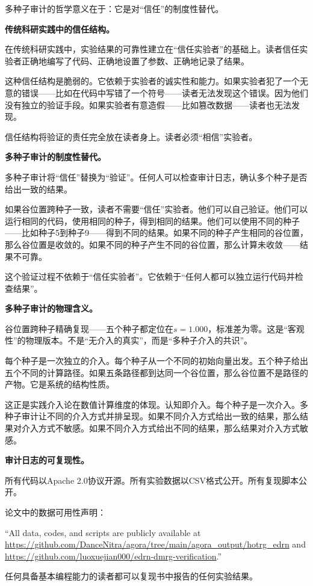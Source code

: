 \documentclass[11pt,a4paper]{book}
\theoremstyle{definition}
\begin{document}
多种子审计的哲学意义在于：它是对“信任”的制度性替代。

\textbf{传统科研实践中的信任结构。}

在传统科研实践中，实验结果的可靠性建立在“信任实验者”的基础上。读者信任实验者正确地编写了代码、正确地设置了参数、正确地记录了结果。

这种信任结构是脆弱的。它依赖于实验者的诚实性和能力。如果实验者犯了一个无意的错误——比如在代码中写错了一个符号——读者无法发现这个错误。因为他们没有独立的验证手段。如果实验者有意造假——比如篡改数据——读者也无法发现。

信任结构将验证的责任完全放在读者身上。读者必须“相信”实验者。

\textbf{多种子审计的制度性替代。}

多种子审计将“信任”替换为“验证”。任何人可以检查审计日志，确认多个种子是否给出一致的结果。

如果谷位置跨种子一致，读者不需要“信任”实验者。他们可以自己验证。他们可以运行相同的代码，使用相同的种子，得到相同的结果。他们可以使用不同的种子——比如种子5到种子9——得到不同的结果。如果不同的种子产生相同的谷位置，那么谷位置是收敛的。如果不同的种子产生不同的谷位置，那么计算未收敛——结果不可靠。

这个验证过程不依赖于“信任实验者”。它依赖于“任何人都可以独立运行代码并检查结果”。

\textbf{多种子审计的物理含义。}

谷位置跨种子精确复现——五个种子都定位在$s=1.000$，标准差为零。这是“客观性”的物理版本。不是“无介入的真实”，而是“多种子介入的共识”。

每个种子是一次独立的介入。每个种子从一个不同的初始向量出发。五个种子给出五个不同的计算路径。如果五条路径都到达同一个谷位置，那么谷位置不是路径的产物。它是系统的结构性质。

这正是实践介入论在数值计算维度的体现。认知即介入。每个种子是一次介入。多种子审计让不同的介入方式并排呈现。如果不同介入方式给出一致的结果，那么结果对介入方式不敏感。如果不同介入方式给出不同的结果，那么结果对介入方式敏感。

\textbf{审计日志的可复现性。}

所有代码以Apache 2.0协议开源。所有实验数据以CSV格式公开。所有复现脚本公开。

论文中的数据可用性声明：

“All data, codes, and scripts are publicly available at \url{https://github.com/DanceNitra/agora/tree/main/agora_output/hotrg_edrn} and \url{https://github.com/luoxuejian000/edrn-dmrg-verification}.”

任何具备基本编程能力的读者都可以复现书中报告的任何实验结果。
\end{document}
